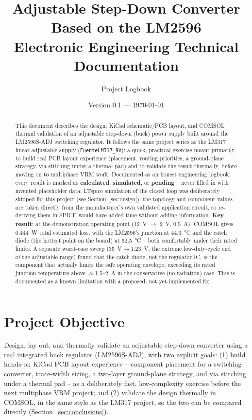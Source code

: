 \documentclass[11pt,letterpaper]{article}
\title{\textbf{Adjustable Step-Down Converter Based on the LM2596} \\[4pt]
\large Electronic Engineering Technical Documentation}
\author{Project Logbook}
\date{Version 0.1 --- \today}
\begin{document}
\maketitle

\begin{abstract}
\noindent This document describes the design, KiCad schematic/PCB layout, and COMSOL thermal validation of
an adjustable step-down (buck) power supply built around the LM2596S-ADJ switching regulator. It follows
the same project series as the LM317 linear adjustable supply (\texttt{FuenteLM317\_9V}): a quick,
practical exercise meant primarily to build real PCB layout experience (placement, routing priorities, a
ground-plane strategy, via stitching under a thermal pad) and to validate the result thermally, before
moving on to multiphase VRM work. Documented as an honest engineering logbook: every result is marked as
\textbf{calculated}, \textbf{simulated}, or \textbf{pending} -- never filled in with invented placeholder
data. LTspice simulation of the closed loop was deliberately skipped for this project (see
Section~\ref{sec:design}): the topology and component values are taken directly from the manufacturer's
own validated application circuit, so re-deriving them in SPICE would have added time without adding
information. \textbf{Key result}: at the demonstration operating point (\SI{12}{\volt}
$\to$ \SI{2}{\volt}, \SI{0.5}{\ampere}), COMSOL gives \SI{0.444}{\watt} total estimated loss, with the
LM2596's junction at \SI{44.3}{\celsius} and the catch diode (the hottest point on the board) at
\SI{52.5}{\celsius} -- both comfortably under their rated limits. A separate worst-case sweep
(\SI{35}{\volt}$\to$\SI{1.23}{\volt}, the extreme low-duty-cycle end of the adjustable range) found that
the catch diode, not the regulator IC, is the component that actually limits the safe operating envelope,
exceeding its rated junction temperature above $\approx$\SI{1.5}{}--\SI{2}{\ampere} in the conservative
(no-radiation) case. This is documented as a known limitation with a proposed, not-yet-implemented fix.
\end{abstract}

\tableofcontents
\newpage

\section{Project Objective}

Design, lay out, and thermally validate an adjustable step-down converter using a real integrated buck
regulator (LM2596S-ADJ), with two explicit goals: (1) build hands-on KiCad PCB layout experience --
component placement for a switching converter, trace-width sizing, a two-layer ground-plane strategy, and
via stitching under a thermal pad -- as a deliberately fast, low-complexity exercise before the next
multiphase VRM project; and (2) validate the design thermally in COMSOL, in the same style as the LM317
project, so the two can be compared directly (Section~\ref{sec:conclusions}).
\end{document}
